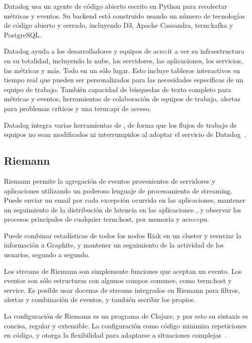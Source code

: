 Datadog usa un agente de código abierto escrito en Python para recolectar
métricas y eventos. Su backend está construido usando un número de tecnologías
de código abierto y cerrado, incluyendo D3, Apache Cassandra, \gls{term:kafka} y
PostgreSQL.

Datadog ayuda a los desarrolladores y equipos de \gls{acro:it} a ver su infraestructura en
su totalidad, incluyendo la nube, los servidores, las aplicaciones, los
servicios, las métricas y más. Todo en un sólo lugar. Esto incluye tableros
interactivos en tiempo real que pueden ser personalizados para las necesidades
específicas de un equipo de trabajo. También capacidad de búsquedas de texto
completo para métricas y eventos, herramientas de colaboración de equipos de
trabajo, alertas para problemas críticos y una \gls{term:api} de acceso.

Datadog integra varias herramientas de , de forma que los flujos de
trabajo de equipos no sean modificados ni interrumpidos al adoptar el servicio
de Datadog~\cite{datadog}.

\subsection{Riemann}

Riemann permite la agregación de eventos provenientes de servidores y
aplicaciones utilizando un poderoso lenguaje de procesamiento de streaming.
Puede enviar un email por cada excepción ocurrida en las aplicaciones, mantener
un seguimiento de la distribución de latencia en las aplicaciones , y
observar los procesos principales de cualquier \gls{term:host}, por memoria y
\gls{acro:cpu}.

Puede combinar estadísticas de todos los nodos Riak en un cluster y reenviar la
información a Graphite, y mantener un seguimiento de la actividad de los
usuarios, segundo a segundo.

Los streams de Riemann son simplemente funciones que aceptan un evento. Los
eventos son sólo estructuras con algunos campos comunes, como \gls{term:host} y
service. Es posible usar docenas de streams integrados en Riemann para
filtros, alertas y combinación de eventos, y también escribir los propios.

La configuración de Riemann es un programa de Clojure, y por esto su sintaxis
es concisa, regular y extensible. La configuración como código minimiza
repeticiones en código, y otorga la flexibilidad para adaptarse a situaciones
complejas~\cite{riemann}.
